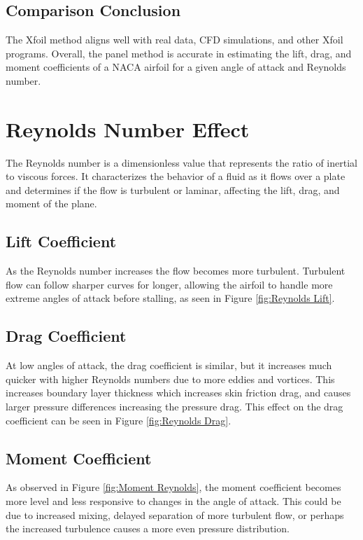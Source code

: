 \documentclass{article}
\begin{document}
\subsection{Comparison Conclusion}
The Xfoil method aligns well with real data, CFD simulations, and other Xfoil programs. Overall, the panel method is accurate in estimating the lift, drag, and moment coefficients of a NACA airfoil for a given angle of attack and Reynolds number.

\section{Reynolds Number Effect}

The Reynolds number is a dimensionless value that represents the ratio of inertial to viscous forces. It characterizes the behavior of a fluid as it flows over a plate and determines if the flow is turbulent or laminar, affecting the lift, drag, and moment of the plane.

\subsection{Lift Coefficient}

As the Reynolds number increases the flow becomes more turbulent. Turbulent flow can follow sharper curves for longer, allowing the airfoil to handle more extreme angles of attack before stalling, as seen in Figure \ref{fig:Reynolds Lift}.

\subsection{Drag Coefficient}

At low angles of attack, the drag coefficient is similar, but it increases much quicker with higher Reynolds numbers due to more eddies and vortices. This increases boundary layer thickness which increases skin friction drag, and causes larger pressure differences increasing the pressure drag. This effect on the drag coefficient can be seen in Figure \ref{fig:Reynolds Drag}.

\subsection{Moment Coefficient}

As observed in Figure \ref{fig:Moment Reynolds}, the moment coefficient becomes more level and less responsive to changes in the angle of attack. This could be due to increased mixing, delayed separation of more turbulent flow, or perhaps the increased turbulence causes a more even pressure distribution.
\end{document}
